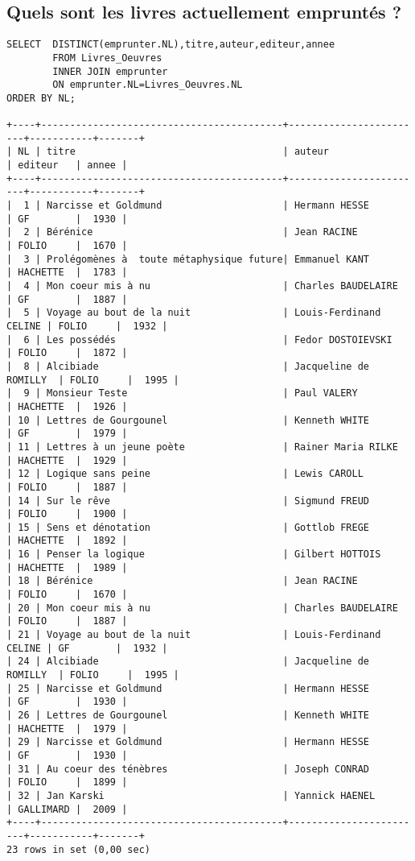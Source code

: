 \documentclass[11]{article}
\begin{document}
\subsection{Quels sont les livres actuellement empruntés ?}

\begin{verbatim}
SELECT 	DISTINCT(emprunter.NL),titre,auteur,editeur,annee 
		FROM Livres_Oeuvres 
		INNER JOIN emprunter 
		ON emprunter.NL=Livres_Oeuvres.NL 
ORDER BY NL;

+----+------------------------------------------+------------------------+-----------+-------+
| NL | titre                                    | auteur                 | editeur   | annee |
+----+------------------------------------------+------------------------+-----------+-------+
|  1 | Narcisse et Goldmund                     | Hermann HESSE          | GF        |  1930 |
|  2 | Bérénice                                 | Jean RACINE            | FOLIO     |  1670 |
|  3 | Prolégomènes à  toute métaphysique future| Emmanuel KANT          | HACHETTE  |  1783 |
|  4 | Mon coeur mis à nu                       | Charles BAUDELAIRE     | GF        |  1887 |
|  5 | Voyage au bout de la nuit                | Louis-Ferdinand CELINE | FOLIO     |  1932 |
|  6 | Les possédés                             | Fedor DOSTOIEVSKI      | FOLIO     |  1872 |
|  8 | Alcibiade                                | Jacqueline de ROMILLY  | FOLIO     |  1995 |
|  9 | Monsieur Teste                           | Paul VALERY            | HACHETTE  |  1926 |
| 10 | Lettres de Gourgounel                    | Kenneth WHITE          | GF        |  1979 |
| 11 | Lettres à un jeune poète                 | Rainer Maria RILKE     | HACHETTE  |  1929 |
| 12 | Logique sans peine                       | Lewis CAROLL           | FOLIO     |  1887 |
| 14 | Sur le rêve                              | Sigmund FREUD          | FOLIO     |  1900 |
| 15 | Sens et dénotation                       | Gottlob FREGE          | HACHETTE  |  1892 |
| 16 | Penser la logique                        | Gilbert HOTTOIS        | HACHETTE  |  1989 |
| 18 | Bérénice                                 | Jean RACINE            | FOLIO     |  1670 |
| 20 | Mon coeur mis à nu                       | Charles BAUDELAIRE     | FOLIO     |  1887 |
| 21 | Voyage au bout de la nuit                | Louis-Ferdinand CELINE | GF        |  1932 |
| 24 | Alcibiade                                | Jacqueline de ROMILLY  | FOLIO     |  1995 |
| 25 | Narcisse et Goldmund                     | Hermann HESSE          | GF        |  1930 |
| 26 | Lettres de Gourgounel                    | Kenneth WHITE          | HACHETTE  |  1979 |
| 29 | Narcisse et Goldmund                     | Hermann HESSE          | GF        |  1930 |
| 31 | Au coeur des ténèbres                    | Joseph CONRAD          | FOLIO     |  1899 |
| 32 | Jan Karski                               | Yannick HAENEL         | GALLIMARD |  2009 |
+----+------------------------------------------+------------------------+-----------+-------+
23 rows in set (0,00 sec)
\end{verbatim}
\end{document}
